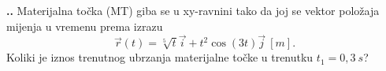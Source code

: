 
\noindent 
\textbf{
\thecjelina.\thezadatak.}
Materijalna točka (MT)  giba se u xy-ravnini tako da joj se vektor položaja mijenja u vremenu prema izrazu
$$
\vec{r}(t)=\sqrt[5]{t}\vec{i}+t^2\cos(3t)\vec{j}\ [m]. 
$$
Koliki je iznos trenutnog ubrzanja materijalne točke u trenutku $t_1=0,3\ s$?

